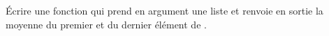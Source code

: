 \question \'Ecrire une fonction  qui prend en argument une liste  et renvoie en sortie la moyenne du premier et du dernier élément de .
